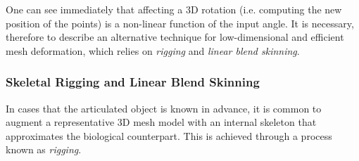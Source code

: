 One can see immediately that affecting a 3D rotation (i.e. computing the new position of the points) is a non-linear function of the input angle. It is necessary, therefore to describe an alternative technique for low-dimensional and efficient mesh deformation, which relies on \emph{rigging} and \emph{linear blend skinning}. 







\subsubsection{Skeletal Rigging and Linear Blend Skinning}

In cases that the articulated object is known in advance, it is common to augment a representative 3D mesh model with an internal skeleton that approximates the biological counterpart. This is achieved through a process known as \emph{rigging}.  


